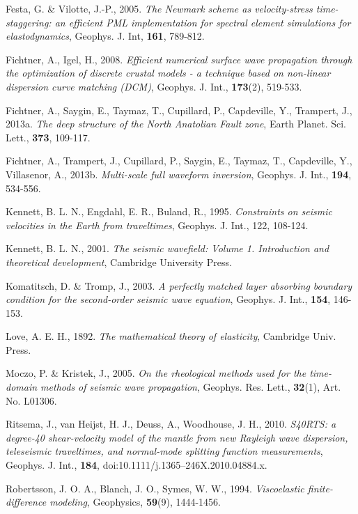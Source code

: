 \begin{thebibliography}{99}
 Festa, G. \& Vilotte, J.-P., 2005. \emph{The
Newmark scheme as velocity-stress time-staggering: an efficient PML
implementation for spectral element simulations for elastodynamics},
Geophys. J. Int, \textbf{161}, 789-812.

 Fichtner, A., Igel, H., 2008. \emph{Efficient numerical surface wave propagation through the
optimization of discrete crustal models - a technique based on
non-linear dispersion curve matching (DCM)}, Geophys. J. Int.,
\textbf{173}(2), 519-533.

 Fichtner, A., Saygin, E., Taymaz, T., Cupillard, P., Capdeville, Y., Trampert, J., 2013a. \emph{The deep structure of the North Anatolian Fault zone}, Earth Planet. Sci. Lett., \textbf{373}, 109-117.

 Fichtner, A., Trampert, J., Cupillard, P., Saygin, E., Taymaz, T., Capdeville, Y., Villasenor, A., 2013b. \emph{Multi-scale full waveform inversion}, Geophys. J. Int., \textbf{194}, 534-556.

 Kennett, B. L. N., Engdahl, E. R., Buland, R., 1995. \emph{Constraints on seismic velocities in the Earth from traveltimes}, Geophys. J. Int., 122, 108-124.

 Kennett, B. L. N., 2001.
\emph{The seismic wavefield: Volume 1. Introduction and theoretical
development}, Cambridge University Press.

 Komatitsch, D. \& Tromp, J., 2003. \emph{A
perfectly matched layer absorbing boundary condition for the
second-order seismic wave equation}, Geophys. J. Int., \textbf{154},
146-153.

 Love, A. E. H., 1892. \emph{The mathematical theory of elasticity}, Cambridge Univ. Press.

 Moczo, P. \& Kristek, J., 2005. \emph{On the rheological methods
used for the time-domain methods of seismic wave propagation},
Geophys. Res. Lett., \textbf{32}(1), Art. No. L01306.

 Ritsema, J., van Heijst, H. J., Deuss, A., Woodhouse, J. H., 2010. \emph{S40RTS: a degree-40 shear-velocity model of the mantle from new Rayleigh wave dispersion, teleseismic traveltimes, and normal-mode splitting function measurements}, Geophys. J. Int., \textbf{184},  doi:10.1111/j.1365–246X.2010.04884.x.

 Robertsson, J. O. A., Blanch, J. O., Symes, W.
W., 1994. \emph{Viscoelastic finite-difference modeling},
Geophysics, \textbf{59}(9), 1444-1456.


\end{thebibliography}
